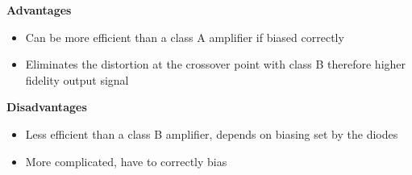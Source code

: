 \documentclass[12pt, a4paper]{article}
\begin{document}
	\textbf{Advantages}
	\begin{itemize}
		\item Can be more efficient than a class A amplifier if biased correctly
		\item Eliminates the distortion at the crossover point with class B therefore higher fidelity output signal
		
	\end{itemize}
	
	\textbf{Disadvantages}
	\begin{itemize}
		\item Less efficient than a class B amplifier, depends on biasing set by the diodes
		\item More complicated, have to correctly bias
	\end{itemize}
	\pagebreak
\end{document}
